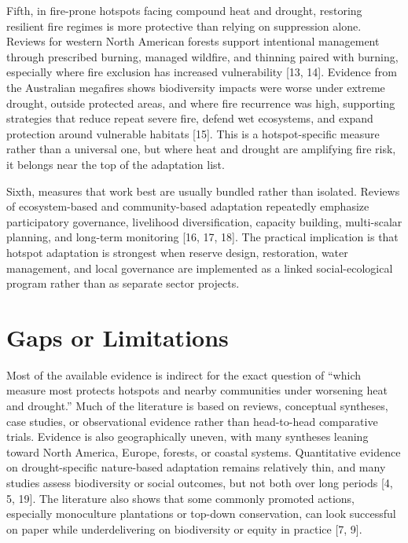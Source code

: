 \documentclass[11pt]{article}
\begin{document}
Fifth, in fire-prone hotspots facing compound heat and drought, restoring resilient fire regimes is more protective than relying on suppression alone. Reviews for western North American forests support intentional management through prescribed burning, managed wildfire, and thinning paired with burning, especially where fire exclusion has increased vulnerability [13, 14]. Evidence from the Australian megafires shows biodiversity impacts were worse under extreme drought, outside protected areas, and where fire recurrence was high, supporting strategies that reduce repeat severe fire, defend wet ecosystems, and expand protection around vulnerable habitats [15]. This is a hotspot-specific measure rather than a universal one, but where heat and drought are amplifying fire risk, it belongs near the top of the adaptation list.

Sixth, measures that work best are usually bundled rather than isolated. Reviews of ecosystem-based and community-based adaptation repeatedly emphasize participatory governance, livelihood diversification, capacity building, multi-scalar planning, and long-term monitoring [16, 17, 18]. The practical implication is that hotspot adaptation is strongest when reserve design, restoration, water management, and local governance are implemented as a linked social-ecological program rather than as separate sector projects.

\section{Gaps or Limitations}
Most of the available evidence is indirect for the exact question of ``which measure most protects hotspots and nearby communities under worsening heat and drought.'' Much of the literature is based on reviews, conceptual syntheses, case studies, or observational evidence rather than head-to-head comparative trials. Evidence is also geographically uneven, with many syntheses leaning toward North America, Europe, forests, or coastal systems. Quantitative evidence on drought-specific nature-based adaptation remains relatively thin, and many studies assess biodiversity or social outcomes, but not both over long periods [4, 5, 19]. The literature also shows that some commonly promoted actions, especially monoculture plantations or top-down conservation, can look successful on paper while underdelivering on biodiversity or equity in practice [7, 9].
\end{document}
